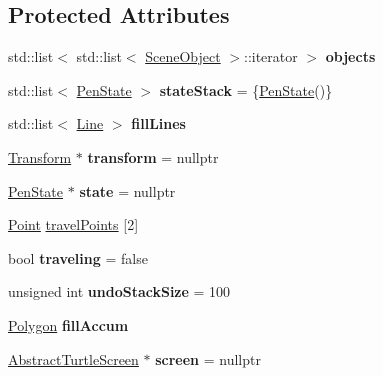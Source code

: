 \subsection*{Protected Attributes}
\begin{DoxyCompactItemize}
\item 
\mbox{\label{classcturtle_1_1Turtle_af8e77a6dc96ceda700f48ca73a3b79eb}} 
std\+::list$<$ std\+::list$<$ \hyperlink{structcturtle_1_1SceneObject}{Scene\+Object} $>$\+::iterator $>$ {\bfseries objects}
\item 
\mbox{\label{classcturtle_1_1Turtle_a3227faccb9a2536f14e129b20a0e93d7}} 
std\+::list$<$ \hyperlink{structcturtle_1_1PenState}{Pen\+State} $>$ {\bfseries state\+Stack} = \{\hyperlink{structcturtle_1_1PenState}{Pen\+State}()\}
\item 
\mbox{\label{classcturtle_1_1Turtle_ae23e860ec0706bc438d8e3fbc2086434}} 
std\+::list$<$ \hyperlink{classcturtle_1_1Line}{Line} $>$ {\bfseries fill\+Lines}
\item 
\mbox{\label{classcturtle_1_1Turtle_a91cf208334713b7d59279b38bd05442e}} 
\hyperlink{classcturtle_1_1Transform}{Transform} $\ast$ {\bfseries transform} = nullptr
\item 
\mbox{\label{classcturtle_1_1Turtle_a4a1b26c2dfad5a0b1f034fa09768ec37}} 
\hyperlink{structcturtle_1_1PenState}{Pen\+State} $\ast$ {\bfseries state} = nullptr
\item 
\hyperlink{structcturtle_1_1ivec2}{Point} \hyperlink{classcturtle_1_1Turtle_ab7156951a007fbbc8a07cbb66e7b888b}{travel\+Points} \mbox{[}2\mbox{]}
\item 
\mbox{\label{classcturtle_1_1Turtle_ab155ecd4e4388b214d387f1b27f2d91a}} 
bool {\bfseries traveling} = false
\item 
\mbox{\label{classcturtle_1_1Turtle_a0860b6dff994d7cfe8b6f0cf7fa9f38b}} 
unsigned int {\bfseries undo\+Stack\+Size} = 100
\item 
\mbox{\label{classcturtle_1_1Turtle_a45a496e0b21f8484fb84b250426b85f1}} 
\hyperlink{classcturtle_1_1Polygon}{Polygon} {\bfseries fill\+Accum}
\item 
\mbox{\label{classcturtle_1_1Turtle_a99bddbd42c3195db14857bed9133e5ac}} 
\hyperlink{classcturtle_1_1AbstractTurtleScreen}{Abstract\+Turtle\+Screen} $\ast$ {\bfseries screen} = nullptr
\end{DoxyCompactItemize}


